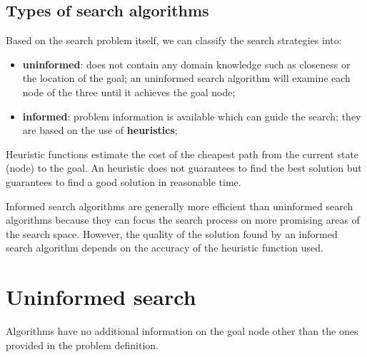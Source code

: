 \documentclass{article}
\begin{document}
\subsection{Types of search algorithms}

Based on the search problem itself, we can classify the search strategies into:

\begin{itemize}
    \item \textbf{uninformed}: does not contain any domain knowledge such as closeness or the location of the goal; an uninformed search algorithm will examine each node of the three until it achieves the goal node;
    \item \textbf{informed}: problem information is available which can guide the search; they are based on the use of \textbf{heuristics};
\end{itemize}

Heuristic functions estimate the cost of the cheapest path from the current state (node) to the goal. An heuristic does not guarantees to find the best solution but guarantees to find a good solution in reasonable time.

Informed search algorithms are generally more efficient than uninformed search algorithms because they can focus the search process on more promising areas of the search space. However, the quality of the solution found by an informed search algorithm depends on the accuracy of the heuristic function used.

\newpage

\section{Uninformed search}

Algorithms have no additional information on the goal node other than the ones provided in the problem definition. 

\begin{center}
\end{center}
\end{document}
